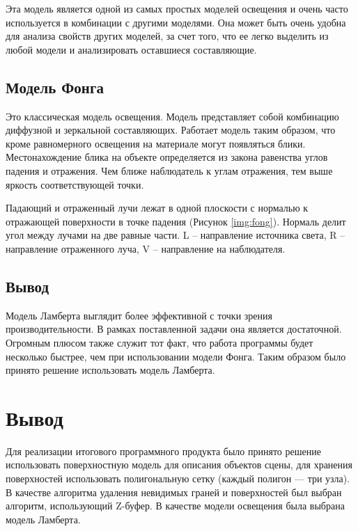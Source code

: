 Эта модель является одной из самых простых моделей освещения и очень часто используется в комбинации с другими моделями. Она может быть очень удобна для анализа свойств других моделей, за счет того, что ее легко выделить из любой модели и анализировать оставшиеся составляющие.

\subsection{Модель Фонга}

Это классическая модель освещения. Модель представляет собой комбинацию диффузной и зеркальной составляющих. Работает модель таким образом, что кроме равномерного освещения на материале могут появляться блики. Местонахождение блика на объекте определяется из закона равенства углов падения и отражения. Чем ближе наблюдатель к углам отражения, тем выше яркость соответствующей точки.

\newpage
{}

Падающий и отраженный лучи лежат в одной плоскости с нормалью к отражающей поверхности в точке падения (Рисунок \ref{img:fong}). Нормаль делит угол между лучами на две равные части. L – направление источника света, R – направление отраженного луча, V – направление на наблюдателя.

\subsection*{Вывод}

Модель Ламберта выглядит более эффективной с точки зрения производительности. В рамках поставленной задачи она является достаточной. Огромным плюсом также служит тот факт, что работа программы будет несколько быстрее, чем при использовании модели Фонга. Таким образом было принято решение использовать модель Ламберта.

\section*{Вывод}

Для реализации итогового программного продукта было принято решение использовать поверхностную модель для описания объектов сцены, для хранения поверхностей использовать полигональную сетку (каждый полигон --- три узла). В качестве алгоритма удаления невидимых граней и поверхностей был выбран алгоритм, использующий Z-буфер. В качестве модели освещения была выбрана модель Ламберта. 





